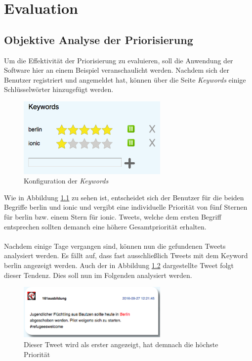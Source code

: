 \chapter{Evaluation}
\section{Objektive Analyse der Priorisierung}
Um die Effektivität der Priorisierung zu evaluieren, soll die Anwendung der Software hier an einem Beispiel veranschaulicht werden. Nachdem sich der Benutzer registriert und angemeldet hat, können über die Seite \textit{Keywords} einige Schlüsselwörter hinzugefügt werden.
%
\medskip
\begin{figure}[!h]
    \centering
    \includegraphics[width=0.65\textwidth]{Graphics/keywords}
    \caption{Konfiguration der \textit{Keywords}}
   \label{fig:keywords}
\end{figure}
%
Wie in Abbildung \ref{fig:keywords} zu sehen ist, entscheidet sich der Benutzer für die beiden Begriffe \glqq berlin\grqq{} und \glqq ionic\grqq{} und vergibt eine individuelle Priorität von fünf Sternen für \glqq berlin\grqq{} bzw. einem Stern für \glqq ionic\grqq{}. Tweets, welche dem ersten Begriff entsprechen sollten demanch eine höhere Gesamtpriorität erhalten. \\\\
Nachdem einige Tage vergangen sind, können nun die gefundenen Tweets analysiert werden. Es fällt auf, dass fast ausschließlich Tweets mit dem Keyword \glqq berlin\grqq{} angezeigt werden. Auch der in Abbildung \ref{fig:tweet_berlin} dargestellte Tweet folgt dieser Tendenz. Dies soll nun im Folgenden analysiert werden. 
%
\medskip
\begin{figure}[!h]
    \centering
    \includegraphics[width=0.65\textwidth]{Graphics/tweet_berlin}
    \caption[Tweet: Schlüsselwort \glqq berlin\grqq{}]{Dieser Tweet wird als erster angezeigt, hat demnach die höchste Priorität}
   \label{fig:tweet_berlin}
\end{figure}
